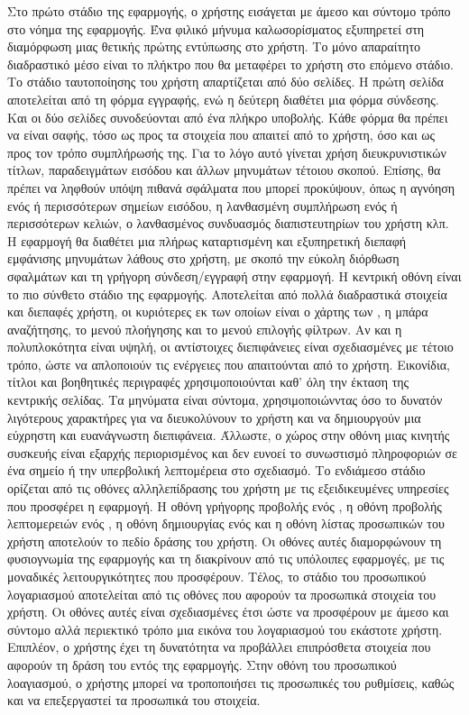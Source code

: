 Στο πρώτο στάδιο της εφαρμογής, ο χρήστης εισάγεται με άμεσο και σύντομο τρόπο στο νόημα της εφαρμογής. Ένα φιλικό μήνυμα καλωσορίσματος εξυπηρετεί στη διαμόρφωση μιας θετικής πρώτης εντύπωσης στο χρήστη. Το μόνο απαραίτητο διαδραστικό μέσο είναι το πλήκτρο που θα μεταφέρει το χρήστη στο επόμενο στάδιο. \newline
\indent
Το στάδιο ταυτοποίησης του χρήστη απαρτίζεται από δύο σελίδες. Η πρώτη σελίδα αποτελείται από τη φόρμα εγγραφής, ενώ η δεύτερη διαθέτει μια φόρμα σύνδεσης. Και οι δύο σελίδες συνοδεύονται από ένα πλήκρο υποβολής. Κάθε φόρμα θα πρέπει να είναι σαφής, τόσο ως προς τα στοιχεία που απαιτεί από το χρήστη, όσο και ως προς τον τρόπο συμπλήρωσής της. Για το λόγο αυτό γίνεται χρήση διευκρυνιστικών τίτλων, παραδειγμάτων εισόδου και άλλων μηνυμάτων τέτοιου σκοπού. Επίσης, θα πρέπει να ληφθούν υπόψη πιθανά σφάλματα που μπορεί προκύψουν, όπως η αγνόηση ενός ή περισσότερων σημείων εισόδου, η λανθασμένη συμπλήρωση ενός ή περισσότερων κελιών, ο λανθασμένος συνδυασμός διαπιστευτηρίων του χρήστη κλπ. Η εφαρμογή θα διαθέτει μια πλήρως καταρτισμένη και εξυπηρετική διεπαφή εμφάνισης μηνυμάτων λάθους στο χρήστη, με σκοπό την εύκολη διόρθωση σφαλμάτων και τη γρήγορη σύνδεση/εγγραφή στην εφαρμογή. \newline
\indent
Η κεντρική οθόνη είναι το πιο σύνθετο στάδιο της εφαρμογής. Αποτελείται από πολλά διαδραστικά στοιχεία και διεπαφές χρήστη, οι κυριότερες εκ των οποίων είναι ο χάρτης των , η μπάρα αναζήτησης, το μενού πλοήγησης και το μενού επιλογής φίλτρων. Αν και η πολυπλοκότητα είναι υψηλή, οι αντίστοιχες διεπιφάνειες είναι σχεδιασμένες με τέτοιο τρόπο, ώστε να απλοποιούν τις ενέργειες που απαιτούνται από το χρήστη. Εικονίδια, τίτλοι και βοηθητικές περιγραφές χρησιμοποιούνται καθ' όλη την έκταση της κεντρικής σελίδας. Τα μηνύματα είναι σύντομα, χρησιμοποιώνντας όσο το δυνατόν λιγότερους χαρακτήρες για να διευκολύνουν το χρήστη και να δημιουργούν μια εύχρηστη και ευανάγνωστη διεπιφάνεια. Άλλωστε, ο χώρος στην οθόνη μιας κινητής συσκευής είναι εξαρχής περιορισμένος και δεν ευνοεί το συνωστισμό πληροφοριών σε ένα σημείο ή την υπερβολική λεπτομέρεια στο σχεδιασμό.\newline
\indent
Το ενδιάμεσο στάδιο ορίζεται από τις οθόνες αλληλεπίδρασης του χρήστη με τις εξειδικευμένες υπηρεσίες που προσφέρει η εφαρμογή. Η οθόνη γρήγορης προβολής ενός , η οθόνη προβολής λεπτομερειών ενός , η οθόνη δημιουργίας ενός  και η οθόνη λίστας προσωπικών  του χρήστη αποτελούν το πεδίο δράσης του χρήστη. Οι οθόνες αυτές διαμορφώνουν τη φυσιογνωμία της εφαρμογής και τη διακρίνουν από τις υπόλοιπες εφαρμογές, με τις μοναδικές λειτουργικότητες που προσφέρουν. \newline
\indent
Τέλος, το στάδιο του προσωπικού λογαριασμού αποτελείται από τις οθόνες που αφορούν τα προσωπικά στοιχεία του χρήστη. Οι οθόνες αυτές είναι σχεδιασμένες έτσι ώστε να προσφέρουν με άμεσο και σύντομο αλλά περιεκτικό τρόπο μια εικόνα του λογαριασμού του εκάστοτε χρήστη. Επιπλέον, ο χρήστης έχει τη δυνατότητα να προβάλλει επιπρόσθετα στοιχεία που αφορούν τη δράση του εντός της εφαρμογής. Στην οθόνη του προσωπικού λοαγιασμού, ο χρήστης μπορεί να τροποποιήσει τις προσωπικές του ρυθμίσεις, καθώς και να επεξεργαστεί τα προσωπικά του στοιχεία.

